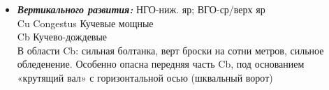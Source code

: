 \begin{itemize}
	\item \textbf{\textit{Вертикального развития:}} НГО-ниж. яр; ВГО-ср/верх яр\\
	 Cu Congestus Кучевые мощные\\
	 Cb Кучево-дождевые\\
	 В области Cb: сильная болтанка, верт броски на сотни метров, сильное обледенение. Особенно опасна передняя часть Cb, под основанием «крутящий вал» с горизонтальной осью (шквальный ворот)
\end{itemize}